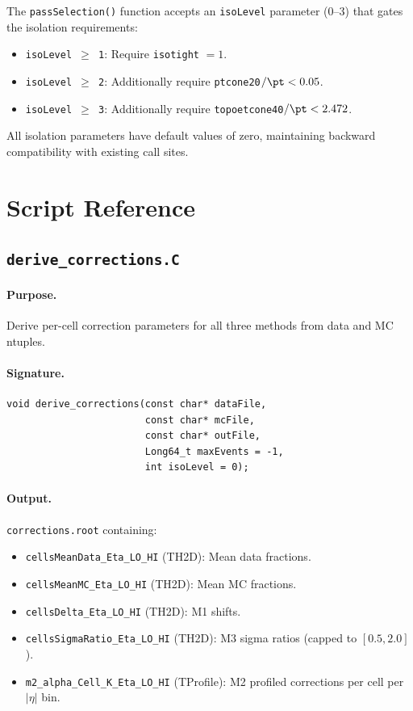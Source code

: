 \documentclass[12pt,a4paper]{article}
\begin{document}
The \texttt{passSelection()} function accepts an \texttt{isoLevel}
parameter (0--3) that gates the isolation requirements:
\begin{itemize}
  \item \texttt{isoLevel $\geq$ 1}: Require \texttt{isotight} $= 1$.
  \item \texttt{isoLevel $\geq$ 2}: Additionally require
    \texttt{ptcone20}$/\pt < 0.05$.
  \item \texttt{isoLevel $\geq$ 3}: Additionally require
    \texttt{topoetcone40}$/\pt < 2.472$.
\end{itemize}

All isolation parameters have default values of zero, maintaining
backward compatibility with existing call sites.

\section{Script Reference}
\label{sec:scripts}

\subsection{\texttt{derive\_corrections.C}}
\label{sec:scripts:derive}

\paragraph{Purpose.} Derive per-cell correction parameters for all three
methods from data and MC ntuples.

\paragraph{Signature.}
\begin{lstlisting}[style=cppstyle]
void derive_corrections(const char* dataFile,
                        const char* mcFile,
                        const char* outFile,
                        Long64_t maxEvents = -1,
                        int isoLevel = 0);
\end{lstlisting}

\paragraph{Output.} \texttt{corrections.root} containing:
\begin{itemize}
  \item \texttt{cellsMeanData\_Eta\_LO\_HI} (TH2D): Mean data fractions.
  \item \texttt{cellsMeanMC\_Eta\_LO\_HI} (TH2D): Mean MC fractions.
  \item \texttt{cellsDelta\_Eta\_LO\_HI} (TH2D): M1 shifts.
  \item \texttt{cellsSigmaRatio\_Eta\_LO\_HI} (TH2D): M3 sigma ratios
    (capped to $[0.5, 2.0]$).
  \item \texttt{m2\_alpha\_Cell\_K\_Eta\_LO\_HI} (TProfile): M2 profiled
    corrections per cell per $|\eta|$ bin.
\end{itemize}
\end{document}
